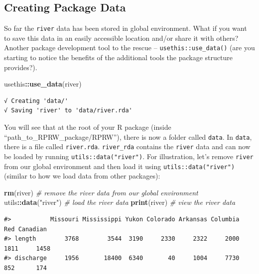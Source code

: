 \documentclass[
]{book}
\newenvironment{Shaded}{\begin{snugshade}}{\end{snugshade}}
\newcommand{\CommentTok}[1]{\textcolor[rgb]{0.56,0.35,0.01}{\textit{#1}}}
\newcommand{\KeywordTok}[1]{\textcolor[rgb]{0.13,0.29,0.53}{\textbf{#1}}}
\newcommand{\NormalTok}[1]{#1}
\newcommand{\OperatorTok}[1]{\textcolor[rgb]{0.81,0.36,0.00}{\textbf{#1}}}
\newcommand{\StringTok}[1]{\textcolor[rgb]{0.31,0.60,0.02}{#1}}
\begin{document}
\hypertarget{creating-data}{%
\subsection{Creating Package Data}\label{creating-data}}

So far the \texttt{river} data has been stored in global environment. What if you want to save this data in an easily accessible location and/or share it with others? Another package development tool to the rescue -- \texttt{usethis::use\_data()} (are you starting to notice the benefits of the additional tools the package structure provides?).

\begin{Shaded}
\begin{Highlighting}[]
\NormalTok{usethis}\OperatorTok{::}\KeywordTok{use_data}\NormalTok{(river)}
\end{Highlighting}
\end{Shaded}

\begin{verbatim}
√ Creating 'data/'
√ Saving 'river' to 'data/river.rda'
\end{verbatim}

You will see that at the root of your R package (inside ``path\_to\_RPRW\_package/RPRW''), there is now a folder called \texttt{data}. In \texttt{data}, there is a file called \texttt{river.rda}. \texttt{river\_rda} contains the \texttt{river} data and can now be loaded by running \texttt{utils::data("river")}. For illustration, let's remove \texttt{river} from our global environment and then load it using \texttt{utils::data("river")} (similar to how we load data from other packages):

\begin{Shaded}
\begin{Highlighting}[]
\KeywordTok{rm}\NormalTok{(river) }\CommentTok{# remove the river data from our global environment}
\NormalTok{utils}\OperatorTok{::}\KeywordTok{data}\NormalTok{(}\StringTok{"river"}\NormalTok{) }\CommentTok{# load the river data}
\KeywordTok{print}\NormalTok{(river) }\CommentTok{# view the river data}
\end{Highlighting}
\end{Shaded}

\begin{verbatim}
#>           Missouri Mississippi Yukon Colorado Arkansas Columbia  Red Canadian
#> length        3768        3544  3190     2330     2322     2000 1811     1458
#> discharge     1956       18400  6340       40     1004     7730  852      174
\end{verbatim}
\end{document}
